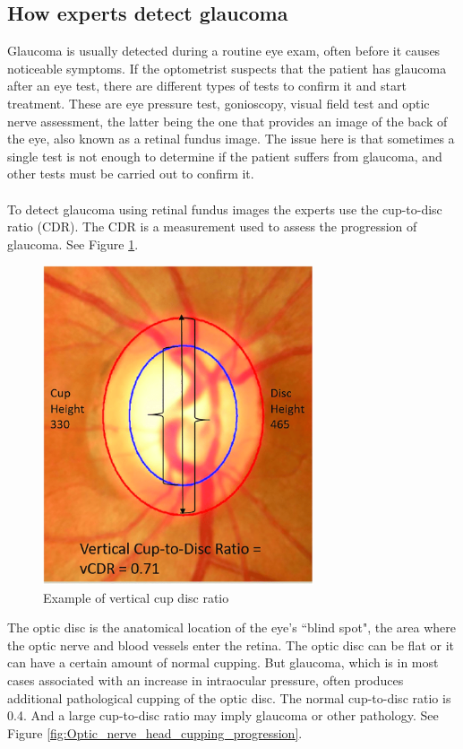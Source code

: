 \documentclass[11pt, a4paper]{article}
\begin{document}
\subsection{How experts detect glaucoma}
Glaucoma is usually detected during a routine eye exam, often before it causes noticeable symptoms.  If the optometrist suspects that the patient has glaucoma after an eye test, there are different types of tests to confirm it and start treatment. These are eye pressure test, gonioscopy, visual field test and optic nerve assessment, the latter being the one that provides an image of the back of the eye, also known as a retinal fundus image. The issue here is that sometimes a single test is not enough to determine if the patient suffers from glaucoma, and other tests must be carried out to confirm it.
\\ 
\\ 
To detect glaucoma using retinal fundus images the experts use the cup-to-disc ratio (CDR). The CDR is a measurement used to assess the progression of glaucoma. See Figure \ref{fig:Example_of_vertical_cup_disc_ratio}.
\begin{figure}[H]
	\centering
	\includegraphics[width=8cm]{imgs/general/Example_of_vertical_cup_disc_ratio.png}
	\caption{Example of vertical cup disc ratio}
	 \label{fig:Example_of_vertical_cup_disc_ratio}
\end{figure}
\noindent The optic disc is the anatomical location of the eye's ``blind spot", the area where the optic nerve and blood vessels enter the retina. The optic disc can be flat or it can have a certain amount of normal cupping. But glaucoma, which is in most cases associated with an increase in intraocular pressure, often produces additional pathological cupping of the optic disc. The normal cup-to-disc ratio is 0.4. And a large cup-to-disc ratio may imply glaucoma or other pathology. See Figure \ref{fig:Optic_nerve_head_cupping_progression}. 
\end{document}
